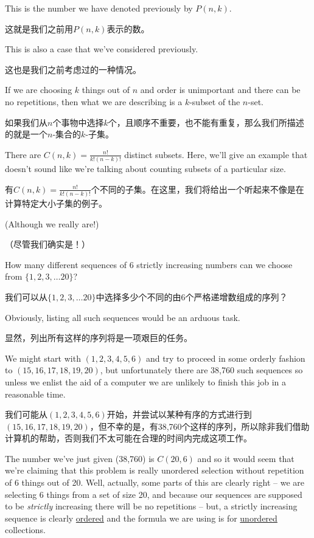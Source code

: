 This is the number we have 
denoted previously by $P(n,k)$.

这就是我们之前用$P(n,k)$表示的数。


This is also a case that we've considered previously.

这也是我们之前考虑过的一种情况。

If we are choosing
$k$ things out of $n$ and order is unimportant and there can be no 
repetitions, then what we are describing is a $k$-subset of the 
$n$-set.

如果我们从$n$个事物中选择$k$个，且顺序不重要，也不能有重复，那么我们所描述的就是一个$n$-集合的$k$-子集。

There are $C(n,k) = \frac{n!}{k!(n-k)!}$ distinct subsets.
Here, we'll give an example that doesn't sound like we're talking
about counting subsets of a particular size.

有$C(n,k) = \frac{n!}{k!(n-k)!}$个不同的子集。在这里，我们将给出一个听起来不像是在计算特定大小子集的例子。

(Although we really are!)

（尽管我们确实是！）

How many different sequences of 6 strictly increasing numbers can 
we choose from $\{1, 2, 3, \ldots 20\}$?

我们可以从$\{1, 2, 3, \ldots 20\}$中选择多少个不同的由6个严格递增数组成的序列？

Obviously, listing all such sequences would be an arduous task.

显然，列出所有这样的序列将是一项艰巨的任务。

We might start with $(1,2,3,4,5,6)$ and try to proceed in some 
orderly fashion to $(15,16,17,18,19,20)$, but unfortunately there
are 38,760 such sequences so unless we enlist the aid of a computer
we are unlikely to finish this job in a reasonable time.

我们可能从$(1,2,3,4,5,6)$开始，并尝试以某种有序的方式进行到$(15,16,17,18,19,20)$，但不幸的是，有38,760个这样的序列，所以除非我们借助计算机的帮助，否则我们不太可能在合理的时间内完成这项工作。

The number
we've just given (38,760) is $C(20,6)$ and so it would seem that we're
claiming that this problem is really unordered selection without repetition
of 6 things out of 20.   Well, actually, some parts of this are clearly
right -- we are selecting 6 things from a set of size 20, and because
our sequences are supposed to be \emph{strictly} increasing there will 
be no repetitions -- but, a strictly increasing sequence is clearly 
\underline{ordered} and the formula we are using is for \underline{unordered}
collections.

